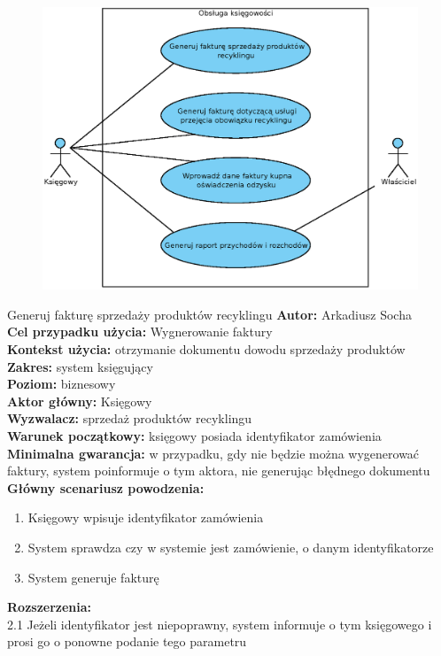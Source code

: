 \begin{figure}[H]
	\centering
	\includegraphics[width=.8\textwidth]{img/UC/ksiegowosc.eps}
\end{figure}

\begin{usecase}{Generuj fakturę sprzedaży produktów recyklingu}
	\textbf{Autor:} Arkadiusz Socha\\
	\textbf{Cel przypadku użycia:} Wygnerowanie faktury \\
	\textbf{Kontekst użycia:} otrzymanie dokumentu dowodu sprzedaży produktów  \\
	\textbf{Zakres:} system księgujący \\
	\textbf{Poziom:} biznesowy \\
	\textbf{Aktor główny:} Księgowy \\
	\textbf{Wyzwalacz:} sprzedaż produktów recyklingu \\
	\textbf{Warunek początkowy:} księgowy posiada identyfikator zamówienia \\
	\textbf{Minimalna gwarancja:} w przypadku, gdy nie będzie można wygenerować faktury, system poinformuje o tym aktora, nie generując błędnego dokumentu \\
	\textbf{Główny scenariusz powodzenia:} 
		\begin{enumerate}
			\item Księgowy wpisuje identyfikator zamówienia
			\item System sprawdza czy w systemie jest zamówienie, o danym identyfikatorze
			\item System generuje fakturę 
		\end{enumerate}
	\textbf{Rozszerzenia:} \\
	2.1 Jeżeli identyfikator jest niepoprawny, system informuje o tym księgowego i prosi go o ponowne podanie tego parametru
\end{usecase}

